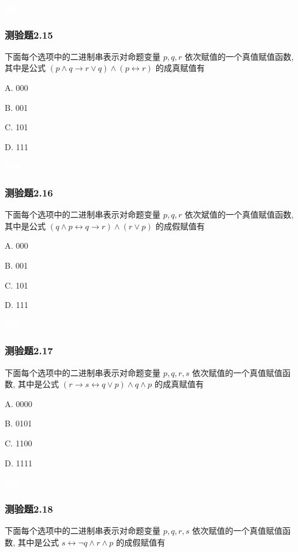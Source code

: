 \documentclass[UTF8, heading=true]{ctexart}
\begin{document}
\textcolor{white}{答案：C}

\subsubsection{测验题2.15}

下面每个选项中的二进制串表示对命题变量 $p, q, r$ 依次赋值的一个真值赋值函数, 其中是公式 $(p \wedge q \rightarrow r \vee q) \wedge(p \leftrightarrow r)$ 的成真赋值有 $\qquad$

A. 000

B. 001

C. 101

D. 111

\textcolor{white}{答案：ACD}


\subsubsection{测验题2.16}

下面每个选项中的二进制串表示对命题变量 $p, q, r$ 依次斌值的一个真值赋值函数, 其中是公式 $(q \wedge p \leftrightarrow q \rightarrow r) \wedge(r \vee p)$ 的成假赋值有 $\qquad$

A. 000

B. 001

C. 101

D. 111

\textcolor{white}{答案：ABC}

\subsubsection{测验题2.17}

下面每个选项中的二进制串表示对命题变量 $p, q, r, s$ 依次赋值的一个真值赋值函数, 其中是公式 $(r \rightarrow s \leftrightarrow q \vee p) \wedge q \wedge p$ 的成真赋值有 $\qquad$

A. 0000

B. 0101

C. 1100

D. 1111

\textcolor{white}{答案：CD}

\subsubsection{测验题2.18}

下面每个选项中的二进制串表示对命题变量 $p, q, r, s$ 依次赋值的一个真值赋值函数, 其中是公式 $s \leftrightarrow \neg q \wedge r \wedge p$ 的成假赋值有 $\qquad$
\end{document}
